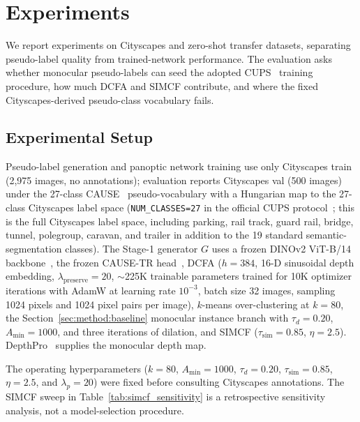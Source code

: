 \documentclass[10pt,twocolumn,letterpaper]{article}
\begin{document}
\section{Experiments}
\label{sec:experiments}

We report experiments on Cityscapes and zero-shot transfer datasets, separating pseudo-label quality from trained-network performance. The evaluation asks whether monocular pseudo-labels can seed the adopted CUPS~\cite{hahn2025cups} training procedure, how much DCFA and SIMCF contribute, and where the fixed Cityscapes-derived pseudo-class vocabulary fails.

\subsection{Experimental Setup}
\label{sec:exp:setup}

Pseudo-label generation and panoptic network training use only Cityscapes train~\cite{cordts2016cityscapes} (2,975 images, no annotations); evaluation reports Cityscapes val (500 images) under the 27-class CAUSE~\cite{kim2024cause} pseudo-vocabulary with a Hungarian map to the 27-class Cityscapes label space (\texttt{NUM\_CLASSES=27} in the official CUPS protocol~\cite{hahn2025cups}; this is the full Cityscapes label space, including parking, rail track, guard rail, bridge, tunnel, polegroup, caravan, and trailer in addition to the 19 standard semantic-segmentation classes). The Stage-1 generator $G$ uses a frozen DINOv2 ViT-B/14 backbone~\cite{oquab2024dinov2}, the frozen CAUSE-TR head~\cite{kim2024cause}, DCFA ($h = 384$, 16-D sinusoidal depth embedding, $\lambda_\text{preserve} = 20$, $\sim$225K trainable parameters trained for 10K optimizer iterations with AdamW at learning rate $10^{-3}$, batch size 32 images, sampling 1024 pixels and 1024 pixel pairs per image), $k$-means over-clustering at $k = 80$, the Section~\ref{sec:method:baseline} monocular instance branch with $\tau_d = 0.20$, $A_\text{min} = 1000$, and three iterations of dilation, and SIMCF ($\tau_\text{sim} = 0.85$, $\eta = 2.5$). DepthPro~\cite{bochkovskii2024depthpro} supplies the monocular depth map.

The operating hyperparameters ($k=80$, $A_\text{min}=1000$, $\tau_d=0.20$, $\tau_\text{sim}=0.85$, $\eta=2.5$, and $\lambda_p=20$) were fixed before consulting Cityscapes annotations. The SIMCF sweep in Table~\ref{tab:simcf_sensitivity} is a retrospective sensitivity analysis, not a model-selection procedure.
\end{document}
